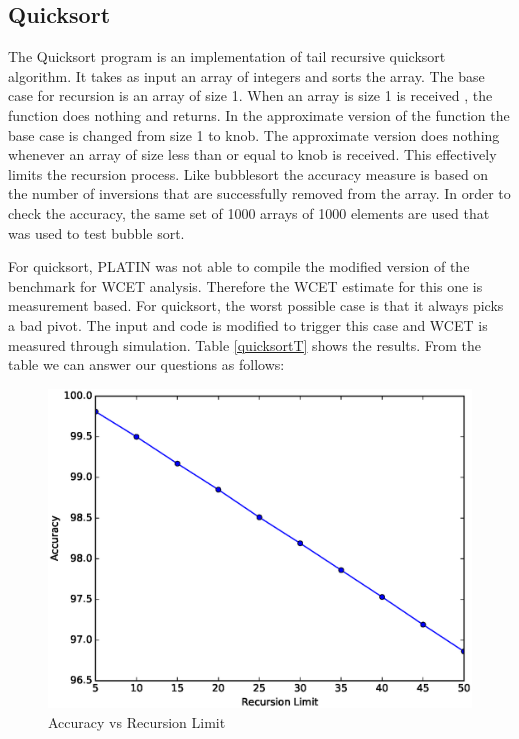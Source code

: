 \subsection{Quicksort}
The Quicksort program is an implementation of tail recursive quicksort algorithm. It takes as input an array of integers and sorts the array. The base case for recursion is an array of size 1. When an array is size 1 is received , the function does nothing and returns. In the approximate version of the function the base case is changed from size 1 to knob. The approximate version does nothing whenever an array of size less than or equal to knob is received. This effectively limits the recursion process. Like bubblesort the accuracy measure is based on the number of inversions that are successfully removed from the array. In order to check the accuracy, the same set of 1000 arrays of 1000 elements are used that was used to test bubble sort.

For quicksort, PLATIN was not able to compile the modified version of the benchmark for WCET analysis. Therefore the WCET estimate for this one is measurement based. For quicksort, the worst possible case is that it always picks a bad pivot. The input and code is modified to trigger this case and WCET is measured through simulation. Table \ref{quicksortT} shows the results. From the table we can answer our questions as follows:



\begin{figure}
  \includegraphics[width=0.95\linewidth]{Results/quicksort1.eps}
  \caption{Accuracy vs Recursion Limit}
  \label{quicksort1}
\end{figure}


